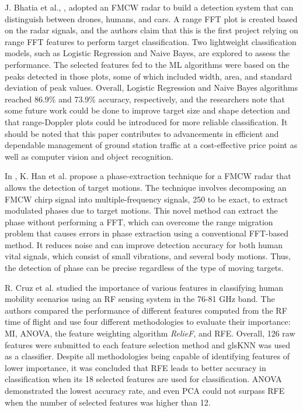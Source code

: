 J. Bhatia et al., \cite{SOA_1DFFT_freqFeatures}, adopted an FMCW radar to build a detection system that can distinguish between drones, humans, and cars. A range FFT plot is created based on the radar signals, and the authors claim that this is the first project relying on range FFT features to perform target classification.  Two lightweight classification models, such as Logistic Regression and Naive Bayes, are explored to assess the performance. The selected features fed to the ML algorithms were based on the peaks detected in those plots, some of which included width, area, and standard deviation of peak values. Overall, Logistic Regression and Naive Bayes algorithms reached 86.9\% and 73.9\% accuracy, respectively, and the researchers note that some future work could be done to improve target size and shape detection and that range-Doppler plots could be introduced for more reliable classification. It should be noted that this paper contributes to advancements in efficient and dependable management of ground station traffic at a cost-effective price point as well as computer vision and object recognition.

In \cite{SOA_phaseExtraction}, K. Han et al. propose a phase-extraction technique for a \gls{FMCW} radar that allows the detection of target motions. The technique involves decomposing an FMCW chirp signal into multiple-frequency signals, 250 to be exact, to extract modulated phases due to target motions. This novel method can extract the phase without performing a \gls{FFT}, which can overcome the range migration problem that causes errors in phase extraction using a conventional FFT-based method. It reduces noise and can improve detection accuracy for both human vital signals, which consist of small vibrations, and several body motions. Thus, the detection of phase can be precise regardless of the type of moving targets.

R. Cruz et al. \cite{Cruz2022} studied the importance of various features in classifying human mobility scenarios using an \gls{RF} sensing system in the 76-81 GHz band. The authors compared the performance of different features computed from the RF time of flight and use four different methodologies to evaluate their importance: \gls{MI}, \gls{ANOVA}, the feature weighting algorithm \textit{RelieF}, and \gls{RFE}. Overall, 126 raw features were submitted to each feature selection method and gls{KNN} was used as a classifier. Despite all methodologies being capable of identifying features of lower importance, it was concluded that RFE leads to better accuracy in classification when its 18 selected features are used for classification. ANOVA demonstrated the lowest accuracy rate, and even PCA could not surpass RFE when  the number of selected features was higher than 12.


